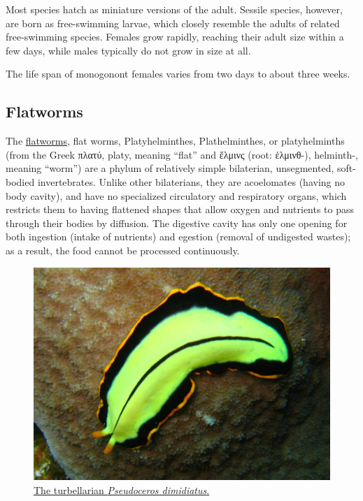 Most species hatch as miniature versions of the adult. Sessile species, however, are born as free-swimming larvae, which closely resemble the adults of related free-swimming species. Females grow rapidly, reaching their adult size within a few days, while males typically do not grow in size at all.

The life span of monogonont females varies from two days to about three weeks.

\hypertarget{flatworms}{%
\subsection{Flatworms}\label{flatworms}}

The \href{https://en.wikipedia.org/wiki/Flatworm}{flatworms}, flat worms, Platyhelminthes, Plathelminthes, or platyhelminths (from the Greek πλατύ, platy, meaning ``flat'' and ἕλμινς (root: ἑλμινθ-), helminth-, meaning ``worm'') are a phylum of relatively simple bilaterian, unsegmented, soft-bodied invertebrates. Unlike other bilaterians, they are acoelomates (having no body cavity), and have no specialized circulatory and respiratory organs, which restricts them to having flattened shapes that allow oxygen and nutrients to pass through their bodies by diffusion. The digestive cavity has only one opening for both ingestion (intake of nutrients) and egestion (removal of undigested wastes); as a result, the food cannot be processed continuously.



\begin{figure}

{\centering \includegraphics[width=0.7\linewidth]{./figures/animals/Pseudoceros_dimidiatus} 

}

\caption{\href{https://commons.wikimedia.org/wiki/File:Pseudoceros_dimidiatus.jpg}{The turbellarian \emph{Pseudoceros dimidiatus}.}}\label{fig:turbellarian}
\end{figure}

